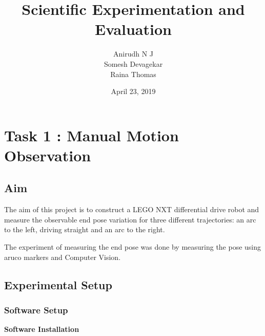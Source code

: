 \documentclass[10pt,a4paper]{article}
\author{\vspace{0.4cm}
	\Large{Anirudh N J}\\\vspace{0.4cm}
	\Large{Somesh Devagekar} \\\vspace{0.8cm}
	\Large{Raina Thomas}}
\title{
	\vspace*{5cm}
	\textbf{\Large{Scientific Experimentation and Evaluation}}
	}
\date{April 23, 2019}
\begin{document}
\begin{titlepage}

	\maketitle
	
\end{titlepage}

	\Large
	\tableofcontents
	\newpage



\section{Task 1 : Manual Motion Observation}

\subsection{Aim}
\Large
The aim of this project is to construct a LEGO NXT differential drive robot and measure the observable end pose variation for three different trajectories: an arc to the left, driving straight and an arc to the right.
\vspace{0.5cm}

The experiment of measuring the end pose was done by measuring the pose using aruco markers and Computer Vision.
   

\subsection{Experimental Setup}
	
	\subsubsection{Software Setup}
		\vspace{0.3cm}
	\textbf{Software Installation}\\
			
\end{document}
